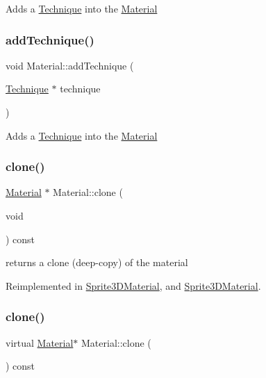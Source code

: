 Adds a \hyperlink{classTechnique}{Technique} into the \hyperlink{classMaterial}{Material} \mbox{\label{classMaterial_a88f5ba975802241aa0ce984257b8a56a}} 
\subsubsection{\texorpdfstring{add\+Technique()}{addTechnique()}\hspace{0.1cm}{\footnotesize\ttfamily [2/2]}}
{\footnotesize\ttfamily void Material\+::add\+Technique (\begin{DoxyParamCaption}\item[{\hyperlink{classTechnique}{Technique} $\ast$}]{technique }\end{DoxyParamCaption})}

Adds a \hyperlink{classTechnique}{Technique} into the \hyperlink{classMaterial}{Material} \mbox{\label{classMaterial_a9e04c5c84a42e10e267157125106104f}} 
\subsubsection{\texorpdfstring{clone()}{clone()}\hspace{0.1cm}{\footnotesize\ttfamily [1/2]}}
{\footnotesize\ttfamily \hyperlink{classMaterial}{Material} $\ast$ Material\+::clone (\begin{DoxyParamCaption}\item[{void}]{ }\end{DoxyParamCaption}) const\hspace{0.3cm}{\ttfamily [virtual]}}

returns a clone (deep-\/copy) of the material 

Reimplemented in \hyperlink{classSprite3DMaterial_a2ce762d8a3abe91eb5abe2df95aa63f4}{Sprite3\+D\+Material}, and \hyperlink{classSprite3DMaterial_ac812fcb53172b407d4401d5242ce8d4e}{Sprite3\+D\+Material}.

\mbox{\label{classMaterial_a68b641cda1fe7dc4ad8dae55a4ec6f93}} 
\subsubsection{\texorpdfstring{clone()}{clone()}\hspace{0.1cm}{\footnotesize\ttfamily [2/2]}}
{\footnotesize\ttfamily virtual \hyperlink{classMaterial}{Material}$\ast$ Material\+::clone (\begin{DoxyParamCaption}{ }\end{DoxyParamCaption}) const\hspace{0.3cm}{\ttfamily [virtual]}}

